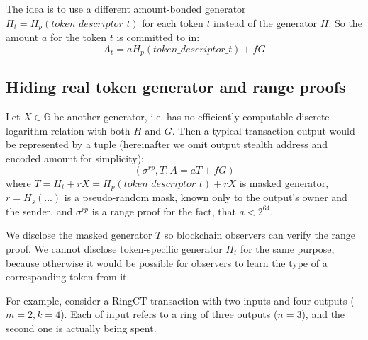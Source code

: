 \documentclass{article}
\begin{document}
The idea is to use a different amount-bonded generator $H_t=H_p(\textit{token\_descriptor\_t})$ for each token $t$ instead of the generator $H$. So the amount $a$ for the token $t$ is committed to in:
\[  A_t = a H_p(\textit{token\_descriptor\_t}) + fG\]

\subsection{Hiding real token generator and range proofs}
Let $X \in \mathbb{G}$ be another generator, i.e. has no efficiently-computable discrete logarithm relation with both $H$ and $G$. Then a typical transaction output would be represented by a tuple (hereinafter we omit output stealth address and encoded amount for simplicity):
\[
    ( \sigma^{rp}, T, A = aT + fG )
\] where $T = H_t + rX = H_p(\textit{token\_descriptor\_t}) + rX $ is masked generator, $r = H_s(...)$ is a pseudo-random mask, known only to the output's owner and the sender, and $\sigma^{rp}$ is a range proof for the fact, that $a < 2^{64}$.

We disclose the masked generator $T$ so blockchain observers can verify the range proof. We cannot disclose token-specific generator $H_t$ for the same purpose, because otherwise it would be possible for observers to learn the type of a corresponding token from it.

For example, consider a RingCT transaction with two inputs and four outputs ($m=2, k=4$). Each of input refers to a ring of three outputs ($n=3$), and the second one is actually being spent.

\vspace{10pt}
\end{document}
